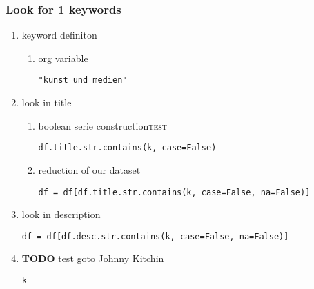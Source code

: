 \documentclass[11pt]{article}
\begin{document}
\subsubsection{Look for 1 keywords}
\label{sec:org3821769}
\begin{enumerate}
\item keyword definiton
\label{sec:orgc53f295}
\begin{enumerate}
\item org variable
\label{sec:orgbdd6316}
\begin{verbatim}
"kunst und medien"
\end{verbatim}
\end{enumerate}

\item look in title
\label{sec:orgc8497ef}
\begin{enumerate}
\item boolean serie construction\hfill{}\textsc{test}
\label{sec:orgab64383}
\begin{verbatim}
df.title.str.contains(k, case=False)
\end{verbatim}

\item reduction of our dataset
\label{sec:orgafbeaf0}
\begin{verbatim}
df = df[df.title.str.contains(k, case=False, na=False)]
\end{verbatim}
\end{enumerate}

\item look in description
\label{sec:org9371280}
\begin{verbatim}
df = df[df.desc.str.contains(k, case=False, na=False)]
\end{verbatim}

\item {\bfseries\sffamily TODO} test
\label{sec:org5c4155e}
goto Johnny Kitchin
\begin{verbatim}
k
\end{verbatim}
\end{enumerate}
\end{document}
